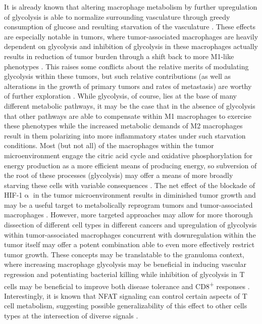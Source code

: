 It is already known that altering macrophage metabolism by further upregulation of glycolysis is able to normalize surrounding vasculature through greedy consumption of glucose and resulting starvation of the vasculature \citep{Wenes2016}. These effects are especially notable in tumors, where tumor\hyp{}associated macrophages are heavily dependent on glycolysis and inhibition of glycolysis in these macrophages actually results in reduction of tumor burden through a shift back to more M1\hyp{}like phenotypes \citep{Rabold2017, Mehla2019}. This raises some conflicts about the relative merits of modulating glycolysis within these tumors, but such relative contributions (as well as alterations in the growth of primary tumors and rates of metastasis) are worthy of further exploration \citep{Mojsilovic2021}. While glycolysis, of course, lies at the base of many different metabolic pathways, it may be the case that in the absence of glycolysis that other pathways are able to compensate within M1 macrophages to exercise these phenotypes while the increased metabolic demands of M2 macrophages result in them polarizing into more inflammatory states under such starvation conditions. Most (but not all) of the macrophages within the tumor microenvironment engage the citric acid cycle and oxidative phosphorylation for energy production as a more efficient means of producing energy, so subversion of the root of these processes (glycolysis) may offer a means of more broadly starving these cells with variable consequences \citep{Yu2020, Puthenveetil2020, Geeraerts2021}. The net effect of the blockade of HIF\hyp{}1$\upalpha$ in the tumor microenvironment results in diminished tumor growth and may be a useful target to metabolically reprogram tumors and tumor\hyp{}associated macrophages \citep{Hong2004}. However, more targeted approaches may allow for more thorough dissection of different cell types in different cancers and upregulation of glycolysis within tumor\hyp{}associated macrophages concurrent with downregulation within the tumor itself may offer a potent combination able to even more effectively restrict tumor growth. These concepts may be translatable to the granuloma context, where increasing macrophage glycolysis may be beneficial in inducing vascular regression and potentiating bacterial killing while inhibition of glycolysis in T cells may be beneficial to improve both disease tolerance and CD8\textsuperscript{+} responses \citep{Phan2017, Tzelepis2018, Russell2019b, Wik2022}. Interestingly, it is known that NFAT signaling can control certain aspects of T cell metabolism, suggesting possible generalizability of this effect to other cells types at the intersection of diverse signals \citep{Vaeth2018}.

